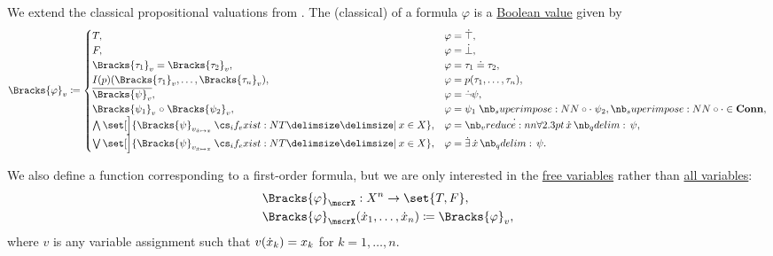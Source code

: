 \begin{definition}
\begin{thmenum}
     We extend the classical propositional valuations from . The (classical)  of a formula \( \varphi \) is a \hyperref[con:boolean_value]{Boolean value} given by
    \begin{equation}\label{eq:def:first_order_valuation/formula_valuation}
      \Bracks{\varphi}_v \coloneqq \begin{cases}
        T,                                                                        &\varphi = \syntop, \\
        F,                                                                        &\varphi = \synbot, \\
        \Bracks{\tau_1}_v = \Bracks{\tau_2}_v,                                    &\varphi = \tau_1 \syneq \tau_2, \\
        I(p)(\Bracks{\tau_1}_v, \ldots, \Bracks{\tau_n}_v),                       &\varphi = p(\tau_1, \ldots, \tau_n), \\
        \oline{\Bracks{\psi}_v},                                               &\varphi = \synneg \psi, \\
        \Bracks{\psi_1}_v \relcirc \Bracks{\psi_2}_v,                    &\varphi = \psi_1 \syncirc \psi_2, {\syncirc} \in \op*{Conn}, \\
        \bigwedge\set[\Big]{ \Bracks{\psi}_{v_{\synx \mapsto x}} \given* x \in X }, &\varphi = \qforall \synx \psi, \\
        \bigvee\set[\Big]{ \Bracks{\psi}_{v_{\synx \mapsto x}} \given* x \in X },   &\varphi = \qexists \synx \psi.
      \end{cases}
    \end{equation}

     We also define a function corresponding to a first-order formula, but we are only interested in the \hyperref[def:first_order_syntax/formula_free_variables]{free variables} rather than \hyperref[def:first_order_syntax/formula_variables]{all variables}:
    \begin{equation*}
      \begin{aligned}
        &\Bracks{\varphi}_\mscrX: X^n \to \set{ T, F }, \\
        &\Bracks{\varphi}_\mscrX(\synx_1, \ldots, \synx_n) \coloneqq \Bracks{\varphi}_v,
      \end{aligned}
    \end{equation*}
    where \( v \) is any variable assignment such that \( v({\dot{x}}_k) = x_k \) for \( k = 1, \ldots, n \).
  \end{thmenum}
\end{definition}
